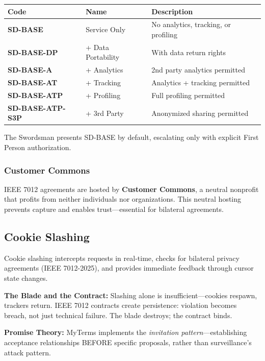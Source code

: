 \documentclass[
  11pt,
]{article}
\newcounter{none} %
\begin{document}
{\def\LTcaptype{none} %
\begin{longtable}[]{@{}lll@{}}
\toprule\noalign{}
Code & Name & Description \\
\midrule\noalign{}
\endhead
\bottomrule\noalign{}
\endlastfoot
\textbf{SD-BASE} & Service Only & No analytics, tracking, or
profiling \\
\textbf{SD-BASE-DP} & + Data Portability & With data return rights \\
\textbf{SD-BASE-A} & + Analytics & 2nd party analytics permitted \\
\textbf{SD-BASE-AT} & + Tracking & Analytics + tracking permitted \\
\textbf{SD-BASE-ATP} & + Profiling & Full profiling permitted \\
\textbf{SD-BASE-ATP-S3P} & + 3rd Party & Anonymized sharing permitted \\
\end{longtable}
}

The Swordsman presents SD-BASE by default, escalating only with explicit
First Person authorization.

\subsubsection{Customer Commons}\label{customer-commons}

IEEE 7012 agreements are hosted by \textbf{Customer Commons}, a neutral
nonprofit that profits from neither individuals nor organizations. This
neutral hosting prevents capture and enables trust---essential for
bilateral agreements.

\subsection{Cookie Slashing}\label{cookie-slashing}

Cookie slashing intercepts requests in real-time, checks for bilateral
privacy agreements (IEEE 7012-2025), and provides immediate feedback
through cursor state changes.

\textbf{The Blade and the Contract:} Slashing alone is
insufficient---cookies respawn, trackers return. IEEE 7012 contracts
create persistence: violation becomes breach, not just technical
failure. The blade destroys; the contract binds.

\textbf{Promise Theory:} MyTerms implements the \emph{invitation
pattern}---establishing acceptance relationships BEFORE specific
proposals, rather than surveillance's attack pattern.
\end{document}
